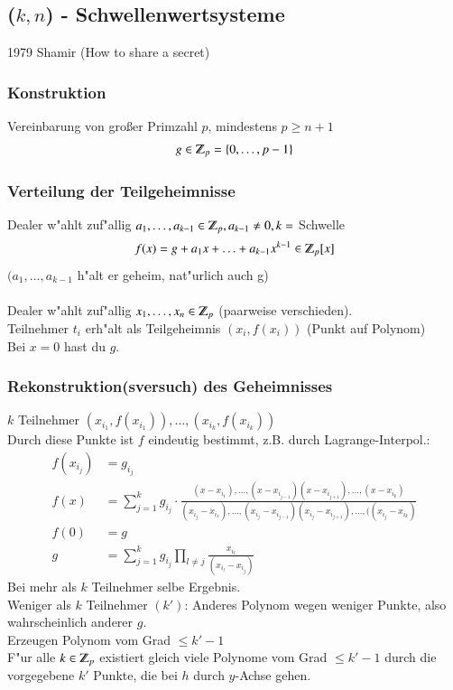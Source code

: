 \subsection{($k, n$) - Schwellenwertsysteme}
1979 Shamir (How to share a secret)

\subsubsection{Konstruktion}
Vereinbarung von gro\ss er Primzahl $p$, mindestens $p \geq n + 1$
\[
	g \in \Z_p = \{0, \ldots , p-1\}
\]

\subsubsection{Verteilung der Teilgeheimnisse}
Dealer w"ahlt zuf"allig $a_1, \ldots, a_{k-1} \in \Z_p, a_{k-1} \neq 0, k =$ Schwelle
\[
	f(x) = g + a_1x + \ldots + a_{k-1}x^{k-1} \in \Z_p[x]
\]
$(a_1, \ldots , a_{k-1}$ h"alt er geheim, nat"urlich auch g)\\
\\
Dealer w"ahlt zuf"allig $x_1, \ldots, x_n \in \Z_p$ (paarweise verschieden). \\
Teilnehmer $t_i$ erh"alt als Teilgeheimnis $(x_i, f(x_i))$ (Punkt auf Polynom)\\
Bei $x=0$ hast du $g$.

\subsubsection{Rekonstruktion(sversuch) des Geheimnisses}
$k$ Teilnehmer $(x_{i_1}, f(x_{i_1})), \ldots, (x_{i_k}, f(x_{i_k}))$ \\
Durch diese Punkte ist $f$ eindeutig bestimmt, z.B. durch Lagrange-Interpol.:
\begin{align*}
	f(x_{i_j}) &= g_{i_j}\\
	f(x) &= \sum_{j=1}^k g_{i_j} \cdot \frac{(x-x_{i_1}), \ldots, (x-x_{i_{j-1}})(x-x_{i_{j+1}}), \ldots, (x-x_{i_k})}
                      {(x_{i_j}-x_{i_1}), \ldots, (x_{i_j}-x_{i_{j-1}})(x_{i_j}-x_{i_{j+1}}), \ldots, ((x_{i_j}-x_{i_k})}\\
	f(0) &= g \\
	g &= \sum_{j=1}^k g_{i_j} \prod_{l \neq j}
				\frac{x_{i_l}}{(x_{i_l}-x_{i_j})}
\end{align*}	
Bei mehr als $k$ Teilnehmer selbe Ergebnis.\\
Weniger als $k$ Teilnehmer $(k')$: Anderes Polynom wegen weniger Punkte, also wahrscheinlich anderer $g$.\\
Erzeugen Polynom vom Grad $\leq k' - 1$ \\
F"ur alle $k \in \Z_p$ existiert gleich viele Polynome vom Grad $\leq k'-1$
durch die vorgegebene $k'$ Punkte, die bei $h$ durch $y$-Achse gehen.